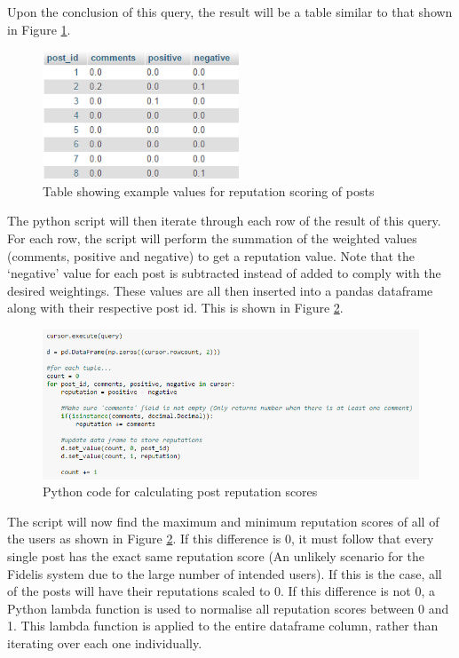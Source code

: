 Upon the conclusion of this query, the result will be a table similar to that shown in Figure \ref{fig:PostRepTable}.

\begin{figure}[H]
\centering
\includegraphics[height=1.5in]{Images/Implementation/PostRepTable}
\caption{Table showing example values for reputation scoring of posts}
\label{fig:PostRepTable}
\end{figure}

The python script will then iterate through each row of the result of this query. For each row, the script will perform the summation of the weighted values (comments, positive and negative) to get a reputation value. Note that the `negative' value for each post is subtracted instead of added to comply with the desired weightings. These values are all then inserted into a pandas dataframe \cite{Pandas} along with their respective post id. This is shown in Figure \ref{fig:PostRepPython1}.

\begin{figure}[H]
\centering
\includegraphics[width=6in]{Images/Implementation/PostRepPython1}
\caption{Python code for calculating post reputation scores}
\label{fig:PostRepPython1}
\end{figure}

The script will now find the maximum and minimum reputation scores of all of the users as shown in Figure \ref{fig:PostRepPython1}. If this difference is 0, it must follow that every single post has the exact same reputation score (An unlikely scenario for the Fidelis system due to the large number of intended users). If this is the case, all of the posts will have their reputations scaled to 0. If this difference is not 0, a Python lambda function is used to normalise all reputation scores between 0 and 1. This lambda function is applied to the entire dataframe column, rather than iterating over each one individually.

